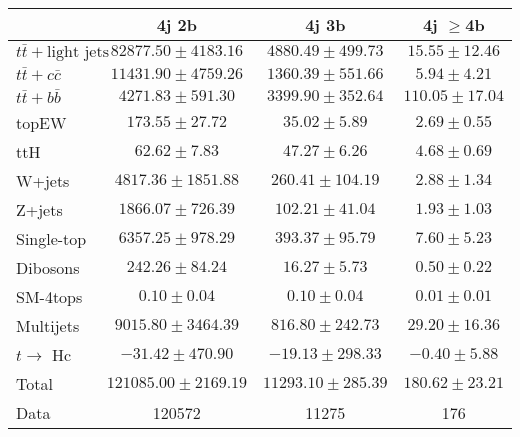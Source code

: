 \begin{table}
\begin{center}
  \begin{tabular}{ | l |  c |  c |  c | }
    \hline \hline 
     & 4j 2b  & 4j 3b  & 4j $\geq$4b  \\ 
    \hline 
     $t\bar{t}+\text{light jets}$  &   $ 82877.50 \pm 4183.16 $ &   $ 4880.49 \pm 499.73 $ &   $ 15.55 \pm 12.46 $ \\ 
     $t\bar{t}+c\bar{c}$  &   $ 11431.90 \pm 4759.26 $ &   $ 1360.39 \pm 551.66 $ &   $ 5.94 \pm 4.21 $ \\ 
     $t\bar{t}+b\bar{b}$  &   $ 4271.83 \pm 591.30 $ &   $ 3399.90 \pm 352.64 $ &   $ 110.05 \pm 17.04 $ \\ 
    topEW  &   $ 173.55 \pm 27.72 $ &   $ 35.02 \pm 5.89 $ &   $ 2.69 \pm 0.55 $ \\ 
    ttH  &   $ 62.62 \pm 7.83 $ &   $ 47.27 \pm 6.26 $ &   $ 4.68 \pm 0.69 $ \\ 
    W+jets  &   $ 4817.36 \pm 1851.88 $ &   $ 260.41 \pm 104.19 $ &   $ 2.88 \pm 1.34 $ \\ 
    Z+jets  &   $ 1866.07 \pm 726.39 $ &   $ 102.21 \pm 41.04 $ &   $ 1.93 \pm 1.03 $ \\ 
    Single-top  &   $ 6357.25 \pm 978.29 $ &   $ 393.37 \pm 95.79 $ &   $ 7.60 \pm 5.23 $ \\ 
    Dibosons  &   $ 242.26 \pm 84.24 $ &   $ 16.27 \pm 5.73 $ &   $ 0.50 \pm 0.22 $ \\ 
    SM-4tops  &   $ 0.10 \pm 0.04 $ &   $ 0.10 \pm 0.04 $ &   $ 0.01 \pm 0.01 $ \\ 
    Multijets  &   $ 9015.80 \pm 3464.39 $ &   $ 816.80 \pm 242.73 $ &   $ 29.20 \pm 16.36 $ \\ 
     $t\rightarrow$ Hc  &   $ -31.42 \pm 470.90 $ &   $ -19.13 \pm 298.33 $ &   $ -0.40 \pm 5.88 $ \\ 
    Total  &   $ 121085.00 \pm 2169.19 $ &   $ 11293.10 \pm 285.39 $ &   $ 180.62 \pm 23.21 $ \\ 
    \hline 
    Data  & 120572  & 11275  & 176  \\ 
    \hline \hline 
  \end{tabular} 



\end{center}
\end{table}
